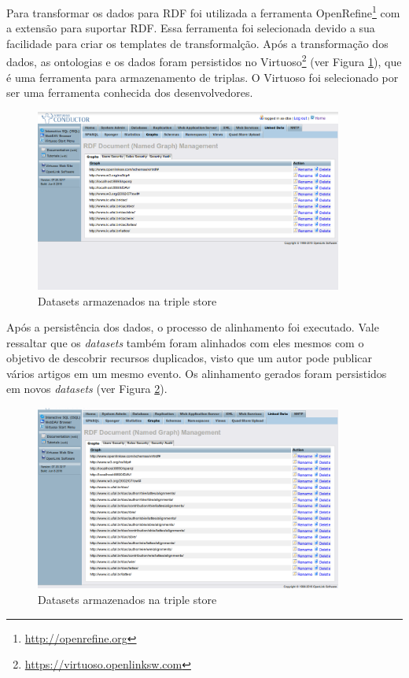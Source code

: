 Para transformar os dados para RDF foi utilizada a ferramenta OpenRefine\footnote{\url{http://openrefine.org}} com a extensão para suportar RDF. Essa ferramenta foi selecionada devido a sua facilidade para criar os templates de transformalção. Após a transformação dos dados, as ontologias e os dados foram persistidos no Virtuoso\footnote{\url{https://virtuoso.openlinksw.com}} (ver Figura \ref{fig:datasets}), que é uma ferramenta para armazenamento de triplas. O Virtuoso foi selecionado por ser uma ferramenta conhecida dos desenvolvedores.

\begin{figure}[!ht]
	\centering
	\includegraphics[width=0.9\textwidth]{./imagens/datasets.png}
    \caption{Datasets armazenados na triple store}
	\label{fig:datasets}
\end{figure}

Após a persistência dos dados, o processo de alinhamento foi executado. Vale ressaltar que os \textit{datasets} também foram alinhados com eles mesmos com o objetivo de descobrir recursos duplicados, visto que um autor pode publicar vários artigos em um mesmo evento. Os alinhamento gerados foram persistidos em novos \textit{datasets} (ver Figura \ref{fig:datasets_alingments}).

\begin{figure}[!ht]
	\centering
	\includegraphics[width=0.9\textwidth]{./imagens/datasets-alinhamento.png}
    \caption{Datasets armazenados na triple store}
	\label{fig:datasets_alingments}
\end{figure}

